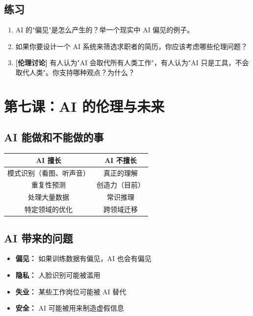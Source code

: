 \documentclass[a4paper,12pt]{ctexart}
\begin{document}
\subsection*{练习}

\begin{enumerate}
  \item AI 的"偏见"是怎么产生的？举一个现实中 AI 偏见的例子。
  \item 如果你要设计一个 AI 系统来筛选求职者的简历，你应该考虑哪些伦理问题？
  \item \textbf{[伦理讨论]} 有人认为"AI 会取代所有人类工作"，有人认为"AI 只是工具，不会取代人类"。你支持哪种观点？为什么？
\end{enumerate}

\section*{第七课：AI 的伦理与未来}

\subsection*{AI 能做和不能做的事}

\begin{center}
\begin{tabular}{|c|c|}
\hline
\textbf{AI 擅长} & \textbf{AI 不擅长} \\ \hline
模式识别（看图、听声音） & 真正的理解 \\ \hline
重复性预测 & 创造力（目前） \\ \hline
处理大量数据 & 常识推理 \\ \hline
特定领域的优化 & 跨领域迁移 \\ \hline
\end{tabular}
\end{center}

\subsection*{AI 带来的问题}

\begin{itemize}
  \item \textbf{偏见：} 如果训练数据有偏见，AI 也会有偏见
  \item \textbf{隐私：} 人脸识别可能被滥用
  \item \textbf{失业：} 某些工作岗位可能被 AI 替代
  \item \textbf{安全：} AI 可能被用来制造虚假信息
\end{itemize}
\end{document}
